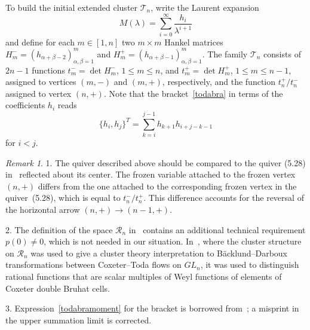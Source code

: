 \documentclass{amsart}
\theoremstyle{definition}
\theoremstyle{remark}
\newtheorem{remark}[theorem]{Remark}
\numberwithin{equation}{section}
\numberwithin{theorem}{section}
\def\RR{{\mathcal R}}
\def\TE{{\mathcal T}}
\begin{document}
To build the initial extended cluster $\TE_n$, 
write the Laurent expansion
$$
M(\lambda)=\sum_{i=0}^\infty \frac{h_i}{\lambda^{i+1}}
$$
and define for each $m\in[1,n]$ two $m\times m$ Hankel matrices $H_m^-=(h_{\alpha+\beta-2})_{\alpha,\beta=1}^m$ and
$H_m^+=(h_{\alpha+\beta-1})_{\alpha,\beta=1}^m$. The family $\TE_n$ consists of $2n-1$ functions $t_m^-=\det H_m^-$, $1\le m\le n$, and 
$t_m^+=\det H_m^+$, $1\le m\le n-1$, assigned to vertices $(m,-)$ and $(m,+)$, respectively, and the
function $t_n^+/t_n^-$ assigned to vertex $(n,+)$. Note that the bracket~\eqref{todabra} in terms of 
the coefficients $h_i$ reads
\begin{equation}\label{todabramoment}
\{h_i,h_j\}^T=\sum_{k=i}^{j-1}h_{k+1}h_{i+j-k-1}
\end{equation}
for $i<j$.


\begin{remark} 1. The quiver described above should be compared to the quiver (5.28) in~\cite{GSV_Acta} 
reflected about its center. The frozen variable attached to the frozen vertex $(n,+)$ differs from the one attached to the corresponding frozen vertex in the quiver~(5.28), which is
equal to $t_n^-/t_n^+$. This difference accounts for the reversal of the horizontal arrow 
$(n,+)\to(n-1,+)$. 


2. The definition of the space $\RR_n$ in~\cite{GSV_Acta} contains an additional technical requirement $p(0)\ne0$, which is not needed in our situation. In~\cite{GSV_Acta}, where the cluster structure on $\RR_n$ was used to give a cluster theory interpretation to B\"acklund--Darboux transformations between Coxeter--Toda flows on $GL_n$, it was used to distinguish
rational functions that are scalar multiples of Weyl functions of elements of Coxeter double Bruhat cells. 


3. Expression~\eqref{todabramoment} for the bracket is borrowed from~\cite{FaGe}; 
a misprint in the upper summation limit is corrected.
\end{remark}
\end{document}
